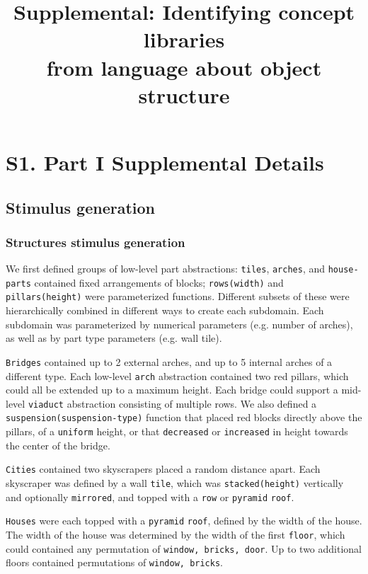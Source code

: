 \documentclass[10pt,letterpaper]{article}
\title{Supplemental: Identifying concept libraries \\ from language about object structure}
\begin{document}
\maketitle



\section{S1. Part I Supplemental Details} \label{sec:s1_part_i}

\subsection{Stimulus generation}

\subsubsection{Structures stimulus generation}

We first defined groups of low-level part abstractions: \texttt{tiles}, \texttt{arches}, and \texttt{house-parts} contained fixed arrangements of blocks; \texttt{rows(width)} and \texttt{pillars(height)} were parameterized functions.
Different subsets of these were hierarchically combined in different ways to create each subdomain.
Each subdomain was parameterized by numerical parameters (e.g. number of arches), as well as by part type parameters (e.g. wall tile).

\texttt{Bridges} contained up to 2 external arches, and up to 5 internal arches of a different type. Each low-level \texttt{arch} abstraction contained two red pillars, which could all be extended up to a maximum height. Each bridge could support a mid-level \texttt{viaduct} abstraction consisting of multiple rows. We also defined a \texttt{suspension(suspension-type)} function that placed red blocks directly above the pillars, of a \texttt{uniform} height, or that \texttt{decreased} or \texttt{increased} in height towards the center of the bridge.

\texttt{Cities} contained two skyscrapers placed a random distance apart. Each skyscraper was defined by a wall \texttt{tile}, which was  \texttt{stacked(height)} vertically and optionally \texttt{mirrored}, and topped with a \texttt{row} or \texttt{pyramid} \texttt{roof}. 

\texttt{Houses} were each topped with a \texttt{pyramid} \texttt{roof}, defined by the width of the house. The width of the house was determined by the width of the first \texttt{floor}, which could contained any permutation of \texttt{{window, bricks, door}}. Up to two additional floors contained permutations of \texttt{{window, bricks}}.
\end{document}
